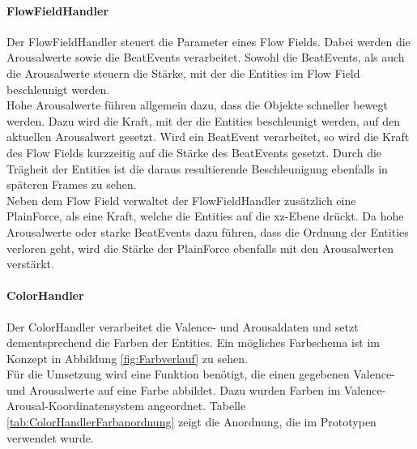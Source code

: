 \documentclass[11pt,a4paper]{article}
\begin{document}
\paragraph{FlowFieldHandler}
Der FlowFieldHandler steuert die Parameter eines Flow Fields. Dabei werden die Arousalwerte sowie die BeatEvents verarbeitet. Sowohl die BeatEvents, als auch die Arousalwerte steuern die Stärke, mit der die Entities im Flow Field beschleunigt werden.\\
Hohe Arousalwerte führen allgemein dazu, dass die Objekte schneller bewegt werden. Dazu wird die Kraft, mit der die Entities beschleunigt werden, auf den aktuellen Arousalwert gesetzt. Wird ein BeatEvent verarbeitet, so wird die Kraft des Flow Fields kurzzeitig auf die Stärke des BeatEvents gesetzt. Durch die Trägheit der Entities ist die daraus resultierende Beschleunigung ebenfalls in späteren Frames zu sehen.\\
Neben dem Flow Field verwaltet der FlowFieldHandler zusätzlich eine PlainForce, als eine Kraft, welche die Entities auf die xz-Ebene drückt. Da hohe Arousalwerte oder starke BeatEvents dazu führen, dass die Ordnung der Entities verloren geht, wird die Stärke der PlainForce ebenfalls mit den Arousalwerten verstärkt.

\paragraph{ColorHandler}
Der ColorHandler verarbeitet die Valence- und Arousaldaten und setzt dementsprechend die Farben der Entities. Ein mögliches Farbschema ist im Konzept in Abbildung \ref{fig:Farbverlauf} zu sehen.\\
Für die Umsetzung wird eine Funktion benötigt, die einen gegebenen Valence- und Arousalwerte auf eine Farbe abbildet. Dazu wurden Farben im Valence-Arousal-Koordinatensystem angeordnet. Tabelle \ref{tab:ColorHandlerFarbanordnung} zeigt die Anordnung, die im Prototypen verwendet wurde.
\end{document}
